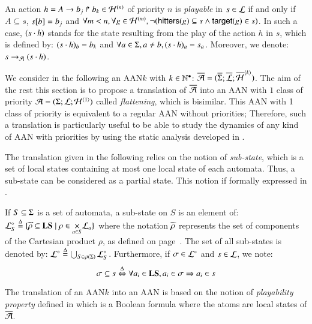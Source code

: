 \begin{definition}
\label{def:playp}
  An action $h = \PHhit{A}{b_j}{b_k} \in \PHa^{(n)}$ of priority $n$
  is \emph{playable} in $s \in \PHl$
  if and only if $A \subseteq s$, $\PHget{s}{b} = b_j$ and
  $\forall m < n, \forall g \in \PHa^{(m)},
    \neg (\PHhitter(g) \subseteq s \wedge \PHtarget(g) \in s)$.
  In such a case, $(s \PHplay h)$ stands for the state resulting from the play
  of the action $h$ in $s$, which is defined by: 
    $(s \PHplay h)_b = b_k$
	and
	$\forall a\in\PHs, a\neq b, (s\PHplay h)_a = s_a$.
  Moreover, we denote: $s \PHPtrans (s \PHplay h)$.
\end{definition}

We consider in the following an AAN$k$ with $k \in \sNN$:
$\ov{\PH} = (\ov{\PHs}; \ov{\PHl}; \ov{\PHa}^{\angles{k}})$.
The aim of the rest this section is to propose a translation of $\oPH$
into an AAN with $1$ class of priority $\PH = (\PHs; \PHl; \PHa^{\angles{1}})$
called \emph{flattening}, which is bisimilar.
This AAN with 1 class of priority is equivalent to a regular AAN without priorities;
Therefore, such a translation is particularly useful to be able to study the dynamics of
any kind of AAN with priorities by using the static analysis developed in .

The translation given in the following relies on the notion of \emph{sub-state},
which is a set of local states containing at most one local state of each automata.
Thus, a sub-state can be considered as a partial state.
This notion if formally expressed in .

\begin{definition}
\label{def:substate}
  If $S \subseteq \PHs$ is a set of automata, a sub-state on $S$ is an element of:
  $\PHsubl[\PHl]_S \DEF \{ \toset{\rho} \subseteq \Proc \mid
    \rho \in \bigtimes{a \in S} \PHl_a \}$
  where the notation $\toset{\rho}$ represents
  the set of components of the Cartesian product $\rho$,
  as defined on page~\pageref{notations}.
  The set of all sub-states is denoted by:
  $\PHsubl[\PHl] \DEF \bigcup_{S \in \powerset(\PHs)} \PHsubl[\PHl]_S$.
  Furthermore, if $\mysigma \in \PHsubl[\PHl]$ and $s \in \PHl$, we note:
    \[\mysigma \subseteq s \EQDEF \forall a_i \in \Proc, a_i \in \mysigma \Rightarrow a_i \in s\]
\end{definition}

The translation of an AAN$k$ into an AAN
is based on the notion of \emph{playability property} defined in 
which is a Boolean formula where the atoms are local states of $\ov{\PH}$.


